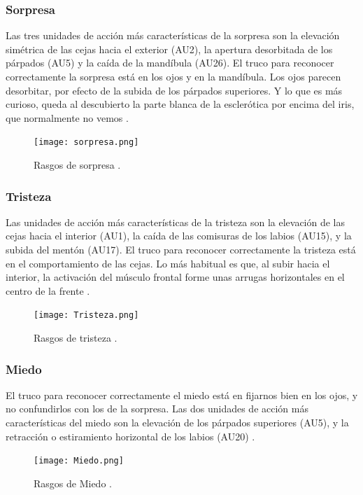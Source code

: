 \subsubsection*{Sorpresa}
Las tres unidades de acción más características de la sorpresa son la elevación simétrica de las cejas hacia el exterior (AU2), la apertura desorbitada de los párpados (AU5) y la caída de la mandíbula (AU26). El truco para reconocer correctamente la sorpresa está en los ojos y en la mandíbula. Los ojos parecen desorbitar, por efecto de la subida de los párpados superiores. Y lo que es más curioso, queda al descubierto la parte blanca de la esclerótica por encima del iris, que normalmente no vemos \cite{ReconocerLasEmociones}.

\begin{figure}[h]
    \centering
    \texttt{[image: sorpresa.png]}
    \caption{Rasgos de sorpresa \cite{ReconocerLasEmociones}.}
    \label{fig:Sorpresa}
\end{figure}

\subsubsection*{Tristeza}
Las unidades de acción más características de la tristeza son la elevación de las cejas hacia el interior (AU1), la caída de las comisuras de los labios (AU15), y la subida del mentón (AU17). El truco para reconocer correctamente la tristeza está en el comportamiento de las cejas. Lo más habitual es que, al subir hacia el interior, la activación del músculo frontal forme unas arrugas horizontales en el centro de la frente \cite{ReconocerLasEmociones}.

\begin{figure}[h]
    \centering
    \texttt{[image: Tristeza.png]}
    \caption{Rasgos de tristeza \cite{ReconocerLasEmociones}.}
    \label{fig:Tristeza}
\end{figure}

\subsubsection*{Miedo}
El truco para reconocer correctamente el miedo está en fijarnos bien en los ojos, y no confundirlos con los de la sorpresa. Las dos unidades de acción más características del miedo son la elevación de los párpados superiores (AU5), y la retracción o estiramiento horizontal de los labios (AU20) \cite{ReconocerLasEmociones}.

\begin{figure}[h]
    \centering
    \texttt{[image: Miedo.png]}
    \caption{Rasgos de Miedo \cite{ReconocerLasEmociones}.}
    \label{fig:Miedo}
\end{figure}

